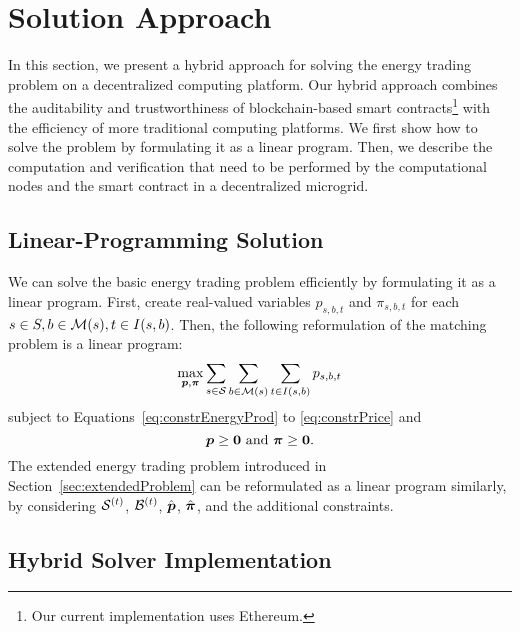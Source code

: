 \section{Solution Approach}
\label{sec:solution}
In this section, we present a hybrid approach for solving the energy trading problem on a decentralized computing platform.
Our hybrid approach combines the auditability and trustworthiness of blockchain-based smart contracts\footnote{Our current implementation uses Ethereum.} with the efficiency of more traditional computing platforms.
We first show how to solve the problem by formulating it as a linear program.
Then, we describe the computation and verification that need to be performed by the computational nodes and the smart contract in a decentralized microgrid.

\subsection{Linear-Programming Solution}
We can solve the basic energy trading problem efficiently by formulating it as a linear program.
First, create real-valued variables $p_{s,b,t}$ and $\pi_{s,b,t}$ for each $s \in S, b \in \mathcal{M}(s), t \in I(s, b)$.
Then, the following reformulation of the matching problem is a linear program:
\begin{equation}
\max_{\vp,\vpi}
\sum_{s \in \calS} \sum_{b \in \calM(s)} \sum_{t \in I(s,b)} p_{s,b,t} \label{eq:linProgObj}
\end{equation}
subject to Equations~\eqref{eq:constrEnergyProd} to \eqref{eq:constrPrice} and
\begin{equation}
\boldsymbol{p} \geq \boldsymbol{0} \text{ and } \boldsymbol{\pi} \geq \boldsymbol{0} .
\end{equation} 
The extended energy trading problem introduced in Section~\ref{sec:extendedProblem} can be reformulated as a linear program similarly, by considering $\mathcal{S}^{(t)}$, $\mathcal{B}^{(t)}$, $\hat{\boldsymbol{p}}$, $\hat{\boldsymbol{\pi}}$, and the additional constraints.

\subsection{Hybrid Solver Implementation}
\label{sec:hybridSolver}

